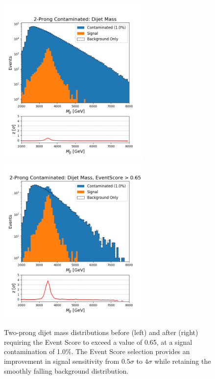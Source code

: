 \documentclass[11pt, a4paper]{article}
\begin{document}
\begin{figure}[H]
	\begin{center}
		\includegraphics[width=213pt]{imgs/bugfix/2Prong_Contaminated_1p0_JJ_Mass_Multi_SaveForPaper_Lead.png}
		\includegraphics[width=213pt]{imgs/bugfix/2Prong_Contaminated_1p0_JJ_Mass_EventScore0p65_Multi_SaveForPaper_Lead.png}
	\end{center}
	\caption{Two-prong dijet mass distributions before (left) and after (right) requiring the Event Score to exceed a value of 0.65, at a signal contamination of 1.0\%. The Event Score selection provides an improvement in signal sensitivity from $0.5\sigma$ to $4\sigma$ while retaining the smoothly falling background distribution.}
	\label{fig:2p_dijet}
\end{figure}
\end{document}

